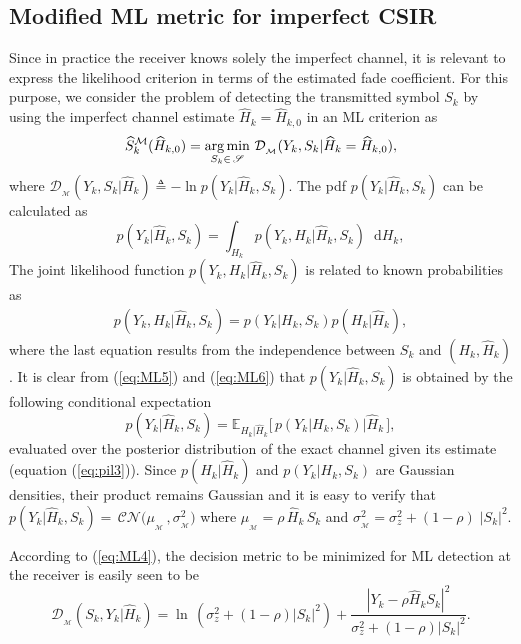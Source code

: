 \documentclass{article}
\def\Hh{{\widehat H}}
\begin{document}
\subsection{Modified ML metric for imperfect CSIR}    
Since in practice the receiver knows solely the imperfect channel, it is relevant to express the likelihood criterion in terms of the estimated fade coefficient. For this purpose, we consider the problem of detecting the transmitted symbol $S_k$ by using the imperfect channel estimate $\widehat{H}_k=\Hh_{k,0}$ in an ML criterion as
\begin{equation}
\label{eq:ML4}
            {\widehat{S}}^{\mathcal{M}}_k(\Hh_{k,0}) =\argmin_{S_k \in \, {\mathscr{S}}} \, \mathcal{D}_{_\mathcal{M}}(Y_k,S_k|\Hh_k=\Hh_{k,0}),
\end{equation} 
where $\mathcal{D}_{_\mathcal{M}}(Y_k,S_k|\Hh_k) \triangleq -\ln p(Y_k|\Hh_k,S_k)$. 
The pdf $p(Y_k|\Hh_k,S_k)$ can be calculated as
\begin{equation}
\label{eq:ML5}
            p(Y_k|\Hh_k,S_k) = \int_{H_k} p(Y_k,H_k|\Hh_k,S_k) \;\; \mathrm{d}H_k,
\end{equation}    
The joint likelihood function ${p(Y_k,H_k|\Hh_k,S_k)}$ is related to known probabilities as
\begin{align}
\label{eq:ML6}
p(Y_k,H_k|\Hh_k,S_k)=p(Y_k|H_k,S_k)p(H_k|\Hh_k),
\end{align} 
where the last equation results from the independence between $S_k$ and $(H_k,\Hh_k)$. 
It is clear from (\ref{eq:ML5}) and (\ref{eq:ML6}) that $p(Y_k|\Hh_k,S_k)$ is obtained by the following conditional expectation 
\begin{equation}
\label{eq:ML7}
            p(Y_k|\Hh_k,S_k) = \mathbb{E}_{H_k |\Hh_k}\big[\,p(Y_k|H_k,S_k)\big |\Hh_k\,\big],
\end{equation}
evaluated over the posterior distribution of the exact channel given its estimate (equation (\ref{eq:pil3})).    
Since $p(H_k|\Hh_k)$  and $p(Y_k|H_k,S_k)$ are Gaussian densities, their product remains Gaussian and it is easy to verify that $p(Y_k|\Hh_k,S_k)=\, \mathcal{CN}\big(\mu_{_\mathcal{M}}\,,{\sigma}^2_{_\mathcal{M}}\big)$ where $\mu_{_\mathcal{M}} =  \rho \, \Hh_k \,S_k$ and $\sigma^2_{_\mathcal{M}} = \sigma^2_z + (1-\rho) \;|S_k|^2$. 
         
According to (\ref{eq:ML4}), the decision metric to be minimized for ML detection at the receiver is easily seen to be
\begin{equation}
\label{eq:ML9}
    \mathcal{D}_{_\mathcal{M}}(S_k,Y_k|\Hh_k)= \ln \,({\sigma^2_z}+(1-\rho)|S_k|^2)+ \frac{|Y_k - \rho \Hh_k S_k|^2}{ {\sigma^2_z}+(1-\rho)|S_k|^2}. 
\end{equation}
\end{document}
